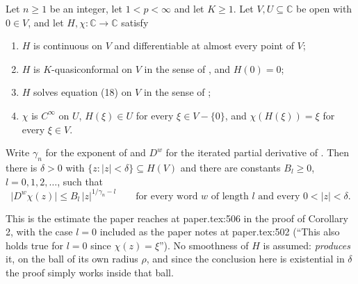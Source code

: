 \begin{lemma}
Let $n\ge1$ be an integer, let $1<p<\infty$ and let $K\ge1$.  Let
$V,U\subseteq\mathbb{C}$ be open with $0\in V$, and let
$H,\chi\colon\mathbb{C}\to\mathbb{C}$ satisfy
\begin{enumerate}
\item[(H1)] $H$ is continuous on $V$ and differentiable at almost every point
  of $V$;
\item[(H2)] $H$ is $K$-quasiconformal on $V$ in the sense of
  , and $H(0)=0$;
\item[(H3)] $H$ solves equation (18) on $V$ in the sense of
  ;
\item[(H4)] $\chi$ is $C^\infty$ on $U$, $H(\xi)\in U$ for every
  $\xi\in V-\{0\}$, and $\chi(H(\xi))=\xi$ for every $\xi\in V$.
\end{enumerate}
Write $\gamma_n$ for the exponent of  and $D^{w}$ for the
iterated partial derivative of .  Then there is $\delta>0$
with $\{z:|z|<\delta\}\subseteq H(V)$ and there are constants $B_l\ge0$,
$l=0,1,2,\dots$, such that
\[
  \bigl|D^{w}\chi(z)\bigr|\le B_l\,|z|^{1/\gamma_n-l}
  \qquad\text{for every word }w\text{ of length }l\text{ and every }
  0<|z|<\delta .
\]

This is the estimate the paper reaches at paper.tex:506 in the proof of
Corollary 2, with the case $l=0$ included as the paper notes at
paper.tex:502 (``This also holds true for $l=0$ since $\chi(z)=\xi$'').  No
smoothness of $H$ is assumed:  \emph{produces} it, on the ball
of its own radius $\rho$, and since the conclusion here is existential in
$\delta$ the proof simply works inside that ball.
\end{lemma}
